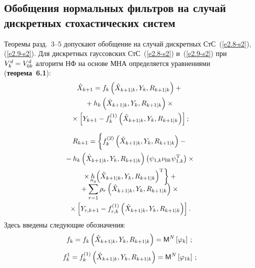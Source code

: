 \begin{multicols}{2}

\section{Обобщения нормальных фильтров на случай дискретных стохастических систем}


Теоремы разд.~3--5 допускают обобщение на случай 
дискретных СтС~(\ref{e2.8-s2}), (\ref{e2.9-s2}). Для
 дискретных гауссовских СтС~(\ref{e2.8-s2}) и~(\ref{e2.9-s2}) 
 при $V_k^d\hm= V_{0k}^d$ алгоритм НФ на основе МНА определяется уравнениями 
 (\textbf{теорема~6.1}):
\begin{multline*}
\hat X_{k+1} = f_k \left(\hat X_{k+1\mid k}, Y_k, R_{k+1\mid k}\right) +{}\\
   {}+ h_k \left(\hat X_{k+1\mid k}, Y_k, R_{k+1\mid k}\right)\times{}\\
   {}\times
\left[ Y_{k+1} - f_k^{(1)} \left(\hat X_{k+1\mid k}, Y_k, R_{k+1\mid k}\right)\right];
\end{multline*}

\vspace*{-12pt}

\noindent
\begin{multline*}
R_{k+1}=\biggl\{ f_k^{(2)} \left(\hat X _{k+1\mid k}, Y_k, R_{k+1\mid k}\right) -{}\\
{}- h_k \left(\hat X_{k+1\mid k}, Y_k, R_{k+1\mid k}\right)
    \left(\psi_{1,k}\nu_{0k}\psi_{1,k}^{\mathrm{T}}\right)\times{}\\
    {}\times h \left(\hat X_{k+1\mid k}, Y_k, R_{k+1\mid k}\right)^{\mathrm{T}}\biggr\} +{}\\[-20pt]
\end{multline*}


\noindent
\begin{multline*}
{}+\sum\limits_{r=1}^{n_y}\rho_r \left(\hat X_{k+1\mid k} , Y_k, R_{k+1\mid k}\right)\times{}\\
{}\times
\left[ Y_{r, k+1} - f_{r,k}^{(1)}
    \left(\hat X_{k+1\mid k}, Y_k,R_{k+1\mid k}\right)\right].
    \end{multline*}
Здесь введены следующие обозначения:
    $$
    f_k=f_k \left(\hat X_{k+1\mid k}, Y_k, R_{k+1\mid k}\right) =
    {\sf M}^N \left[\varphi_k\right]\,;\\
    $$
    $$
    f_k^1 = f_k^{(1)} \left(\hat X_{k+1\mid k}, Y_k, R_{k+1\mid k}\right) = 
    {\sf M}^N \left[ \varphi_{1k}\right]\,;
    $$
    
    \vspace*{-12pt}
    

\end{multicols}
